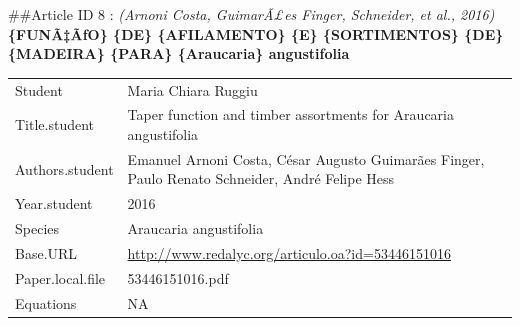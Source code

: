 \documentclass[]{article}
\begin{document}
\#\#Article ID 8 : \emph{(Arnoni Costa, GuimarÃ£es Finger, Schneider, et
al., 2016)} \textbf{\{FUNÃ‡ÃƒO\} \{DE\} \{AFILAMENTO\} \{E\}
\{SORTIMENTOS\} \{DE\} \{MADEIRA\} \{PARA\} \{Araucaria\} angustifolia}

\begin{longtable}[]{@{}ll@{}}
\toprule
\endhead
\begin{minipage}[t]{0.21\columnwidth}\raggedright
Student\strut
\end{minipage} & \begin{minipage}[t]{0.73\columnwidth}\raggedright
Maria Chiara Ruggiu\strut
\end{minipage}\tabularnewline
\begin{minipage}[t]{0.21\columnwidth}\raggedright
Title.student\strut
\end{minipage} & \begin{minipage}[t]{0.73\columnwidth}\raggedright
Taper function and timber assortments for Araucaria angustifolia\strut
\end{minipage}\tabularnewline
\begin{minipage}[t]{0.21\columnwidth}\raggedright
Authors.student\strut
\end{minipage} & \begin{minipage}[t]{0.73\columnwidth}\raggedright
Emanuel Arnoni Costa, César Augusto Guimarães Finger, Paulo Renato
Schneider, André Felipe Hess\strut
\end{minipage}\tabularnewline
\begin{minipage}[t]{0.21\columnwidth}\raggedright
Year.student\strut
\end{minipage} & \begin{minipage}[t]{0.73\columnwidth}\raggedright
2016\strut
\end{minipage}\tabularnewline
\begin{minipage}[t]{0.21\columnwidth}\raggedright
Species\strut
\end{minipage} & \begin{minipage}[t]{0.73\columnwidth}\raggedright
Araucaria angustifolia\strut
\end{minipage}\tabularnewline
\begin{minipage}[t]{0.21\columnwidth}\raggedright
Base.URL\strut
\end{minipage} & \begin{minipage}[t]{0.73\columnwidth}\raggedright
\url{http://www.redalyc.org/articulo.oa?id=53446151016}\strut
\end{minipage}\tabularnewline
\begin{minipage}[t]{0.21\columnwidth}\raggedright
Paper.local.file\strut
\end{minipage} & \begin{minipage}[t]{0.73\columnwidth}\raggedright
53446151016.pdf\strut
\end{minipage}\tabularnewline
\begin{minipage}[t]{0.21\columnwidth}\raggedright
Equations\strut
\end{minipage} & \begin{minipage}[t]{0.73\columnwidth}\raggedright
NA\strut
\end{minipage}\tabularnewline
\bottomrule
\end{longtable}
\end{document}
